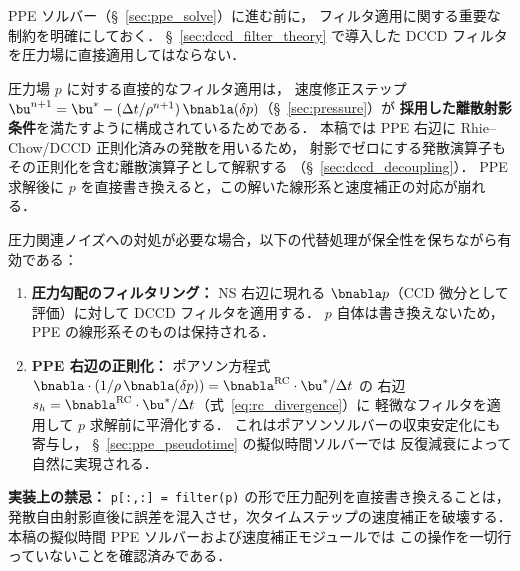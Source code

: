%
%
%
%

\begin{tcolorbox}[warnbox, title={圧力場へのフィルタ適用禁止}]
\label{sec:dccd_pressure_nofilt}%
\label{warn:pressure_direct_filter}%
PPE ソルバー（§~\ref{sec:ppe_solve}）に進む前に，
フィルタ適用に関する重要な制約を明確にしておく．
§~\ref{sec:dccd_filter_theory} で導入した DCCD フィルタを圧力場に直接適用してはならない．

圧力場 $p$ に対する直接的なフィルタ適用は，
速度修正ステップ $\bu^{n+1} = \bu^* - (\Delta t/\rho^{n+1})\,\bnabla(\delta p)$（§~\ref{sec:pressure}）が
\textbf{採用した離散射影条件}を満たすように構成されているためである．
本稿では PPE 右辺に Rhie--Chow/DCCD 正則化済みの発散を用いるため，
射影でゼロにする発散演算子もその正則化を含む離散演算子として解釈する
（§~\ref{sec:dccd_decoupling}）．
PPE 求解後に $p$ を直接書き換えると，この解いた線形系と速度補正の対応が崩れる．

圧力関連ノイズへの対処が必要な場合，以下の代替処理が保全性を保ちながら有効である：
\begin{enumerate}
  \item \textbf{圧力勾配のフィルタリング：}
        NS 右辺に現れる $\bnabla p$（CCD 微分として評価）に対して DCCD フィルタを適用する．
        $p$ 自体は書き換えないため，PPE の線形系そのものは保持される．
  \item \textbf{PPE 右辺の正則化：}
        ポアソン方程式 $\bnabla\cdot(1/\rho\,\bnabla(\delta p)) = \bnabla^{\mathrm{RC}}\cdot\bu^*/\Delta t$ の
        右辺 $s_h = \bnabla^{\mathrm{RC}}\cdot\bu^*/\Delta t$（式~\eqref{eq:rc_divergence}）に
        軽微なフィルタを適用して $p$ 求解前に平滑化する．
        これはポアソンソルバーの収束安定化にも寄与し，
        §~\ref{sec:ppe_pseudotime} の擬似時間ソルバーでは
        反復減衰によって自然に実現される．
\end{enumerate}

\noindent\textbf{実装上の禁忌：}
\texttt{p[:,:] = filter(p)} の形で圧力配列を直接書き換えることは，
発散自由射影直後に誤差を混入させ，次タイムステップの速度補正を破壊する．
本稿の擬似時間 PPE ソルバーおよび速度補正モジュールでは
この操作を一切行っていないことを確認済みである．
\end{tcolorbox}
